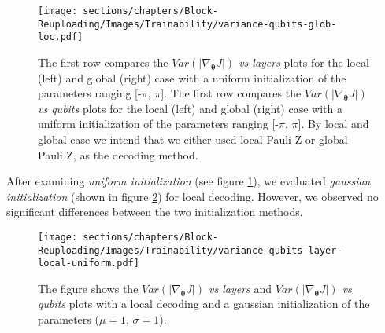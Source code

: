 \begin{figure}[H]
    \centering
    \texttt{[image: sections/chapters/Block-Reuploading/Images/Trainability/variance-qubits-glob-loc.pdf]}
    \caption{The first row compares the \textit{$Var(|\nabla_{\bm{\theta}}J|)$ vs layers} plots for the local (left)
    and global (right) case with a uniform initialization of the parameters ranging [-$\pi$, $\pi$].
    The first row compares the \textit{$Var(|\nabla_{\bm{\theta}}J|)$ vs qubits} plots for the local (left)
    and global (right) case with a uniform initialization of the parameters ranging [-$\pi$, $\pi$].
    By local and global case we intend that we either used local Pauli Z or global Pauli Z, as the 
    decoding method.}
    \label{fig:uniform-init}
\end{figure}

After examining \textit{uniform initialization} (see figure \ref{fig:uniform-init}), we evaluated 
\textit{gaussian initialization} (shown in figure \ref{fig:local-gauss}) for local decoding. However, 
we observed no significant differences between the two initialization methods.


\begin{figure}[H]
    \centering
    \texttt{[image: sections/chapters/Block-Reuploading/Images/Trainability/variance-qubits-layer-local-uniform.pdf]}
    \caption{The figure shows the \textit{$Var(|\nabla_{\bm{\theta}}J|)$ vs layers} and
    \textit{$Var(|\nabla_{\bm{\theta}}J|)$ vs qubits} plots with a local decoding
    and a gaussian initialization of the parameters ($\mu = 1$, $\sigma = 1$).}
    \label{fig:local-gauss}
\end{figure}